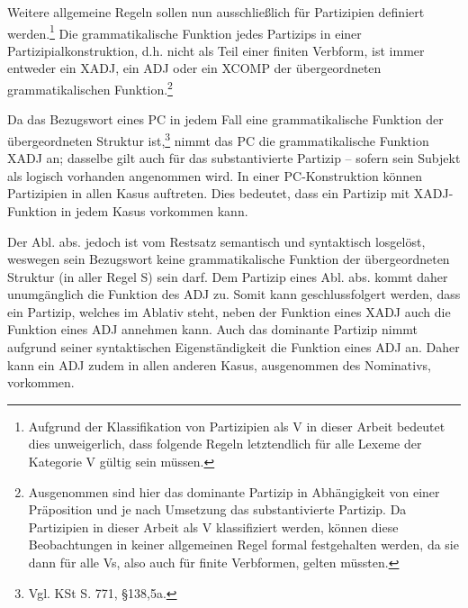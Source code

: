 \documentclass[12pt,a4paper]{article}
\begin{document}

Weitere allgemeine Regeln sollen nun ausschließlich für Partizipien definiert werden.\footnote{Aufgrund der Klassifikation von Partizipien als V in dieser Arbeit bedeutet dies unweigerlich, dass folgende Regeln letztendlich für alle Lexeme der Kategorie V gültig sein müssen.}
Die grammatikalische Funktion jedes Partizips in einer Partizipialkonstruktion, d.h. nicht als Teil einer finiten Verbform, ist immer entweder ein XADJ, ein ADJ oder ein XCOMP der übergeordneten grammatikalischen Funktion.\footnote{Ausgenommen sind hier das dominante Partizip in Abhängigkeit von einer Präposition und je nach Umsetzung das substantivierte Partizip. Da Partizipien in dieser Arbeit als V klassifiziert werden, können diese Beobachtungen in keiner allgemeinen Regel formal festgehalten werden, da sie dann für alle Vs, also auch für finite Verbformen, gelten müssten.}

Da das Bezugswort eines PC in jedem Fall eine grammatikalische Funktion der übergeordneten Struktur ist,\footnote{Vgl. KSt S. 771, §138,5a.} nimmt das PC die grammatikalische Funktion XADJ an; dasselbe gilt auch für das substantivierte Partizip -- sofern sein Subjekt als logisch vorhanden angenommen wird. In einer PC-Konstruktion können Partizipien in allen Kasus auftreten. Dies bedeutet, dass ein Partizip mit XADJ-Funktion in jedem Kasus vorkommen kann.

Der Abl. abs. jedoch ist vom Restsatz semantisch und syntaktisch losgelöst, weswegen sein Bezugswort keine grammatikalische Funktion der übergeordneten Struktur (in aller Regel S) sein darf. Dem Partizip eines Abl. abs. kommt daher unumgänglich die Funktion des ADJ zu. Somit kann geschlussfolgert werden, dass ein Partizip, welches im Ablativ steht, neben der Funktion eines XADJ auch die Funktion eines ADJ annehmen kann. Auch das dominante Partizip nimmt aufgrund seiner syntaktischen Eigenständigkeit die Funktion eines ADJ an. Daher kann ein ADJ zudem in allen anderen Kasus, ausgenommen des Nominativs, vorkommen.
\end{document}
